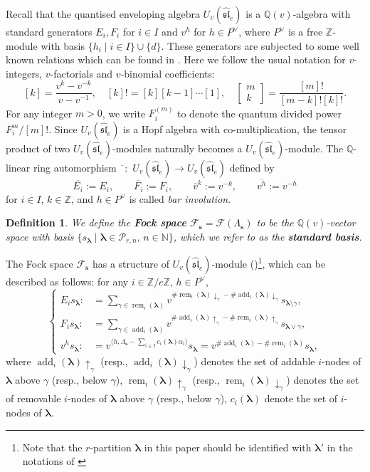 \documentclass[a4paper,10pt]{amsart}
\theoremstyle{plain}
\def\bs{{\boldsymbol{s}}}
\def\Z{{\mathbb Z}}
\def\blam{{\boldsymbol \lambda}}
\newcommand{\add}{\operatorname{add}}
\newcommand{\rem}{\operatorname{rem}}
\theoremstyle{plain}
\newtheorem{definition}[theorem]{Definition}
\numberwithin{equation}{section}
\newenvironment{equa}
  {\refstepcounter{theorem}%
   \renewcommand\theequation{\thetheorem}%
   \begin{equation}}
  {\end{equation}}
\begin{document}
Recall that the quantised enveloping algebra $U_v(\widehat{\mathfrak{sl}}_e)$ is a $\mathbb{Q}(v)$-algebra with standard generators $E_i, F_i$ for $i\in I$ and $v^h$ for $h\in P^\vee$, where $P^\vee$ is a free $\mathbb{Z}$-module with basis $\{h_i\mid i\in I\}\cup\{d\}$.
These generators are subjected to some well known relations which can be found in \cite[\S 4.1]{LLT96}. Here we follow the usual notation for $v$-integers, $v$-factorials and $v$-binomial coefficients:
$$[k]=\dfrac{v^{k}-v^{-k}}{v-v^{-1}}, \quad [k]!=[k][k-1] \cdots [1], \quad \left[\begin{matrix}
m\\k
\end{matrix}\right]=\dfrac{[m]!}{[m-k]![k]!}.$$
For any integer $m>0$, we write $F_i^{(m)}$ to denote the quantum divided power $F_i^m/[m]!$.
Since $U_v(\widehat{\mathfrak{sl}}_e)$ is a Hopf algebra with co-multiplication, the tensor product of two $U_v(\widehat{\mathfrak{sl}}_e)$-modules naturally becomes a $U_v(\widehat{\mathfrak{sl}}_e)$-module.
The $\mathbb{Q}$-linear ring automorphism $\overline{\phantom{o}}:\,\,U_v(\widehat{\mathfrak{sl}}_e)\to U_v(\widehat{\mathfrak{sl}}_e)$ defined by
\[\overline{E_i}:=E_i,\qquad \overline{F_i}:=F_i,\qquad \overline v^k:=v^{-k}, \qquad \overline{v^h}:=v^{-h}\]
for $i\in I$, $k\in\Z$, and $h\in P^\vee$ is called \emph{bar involution}.

\begin{definition} We define the \textbf{Fock space} \(\mathcal{F}_{\bs}=\mathcal{F}(\Lambda_\bs)\) to be the \(\mathbb{Q}(v)\)-vector space with basis \(\{s_{\blam} \mid \blam\in\mathscr{P}_{r,n},\, n\in\mathbb{N}\}\), which we refer to as the \textbf{standard basis}.
\end{definition}

The Fock space $\mathcal{F}_{\bs}$ has a structure of $U_v(\widehat{\mathfrak{sl}}_e)$-module (\cite[Proposition 2.6]{AM})\footnote{Note that the $r$-partition $\blam$ in this paper should be identified with $\blam'$ in the notations of \cite{AM}}, which can be described as follows: for any $i\in \Z/e\Z$, $h\in P^\vee$,
\begin{equa}\label{action1}\left\{\begin{aligned}
 E_is_\blam:&=\sum_{\gamma\in\rem_i(\blam)}v^{\#\rem_i(\blam)\downarrow_{\gamma}-\#\add_i(\blam)\downarrow_{\gamma}}s_{\blam\setminus\gamma},\\
 F_is_\blam:&=\sum_{\gamma\in\add_i(\blam)}v^{\#\add_i(\blam)\uparrow_{\gamma}-\#\rem_i(\blam)\uparrow_{\gamma}}s_{\blam\vee\gamma},\\
 v^h s_\blam:&=v^{\langle h,\Lambda_\bs-\sum_{i\in I}c_i(\blam)\alpha_i\rangle}s_\blam=v^{\#\add_i(\blam)-\#\rem_i(\blam)}s_\blam,
\end{aligned}\right.
\end{equa}
where $\add_i(\blam)\!\uparrow_{\gamma}$ (resp., $\add_i(\blam)\!\downarrow_{\gamma}$) denotes the set of addable $i$-nodes of $\blam$ above $\gamma$ (resp., below $\gamma$), $\rem_i(\blam)\!\uparrow_{\gamma}$ (resp., $\rem_i(\blam)\!\downarrow_{\gamma}$) denotes the set of removable $i$-nodes of $\blam$ above $\gamma$ (resp., below $\gamma$), $c_i(\blam)$ denote the set of $i$-nodes of $\blam$.
\end{document}

